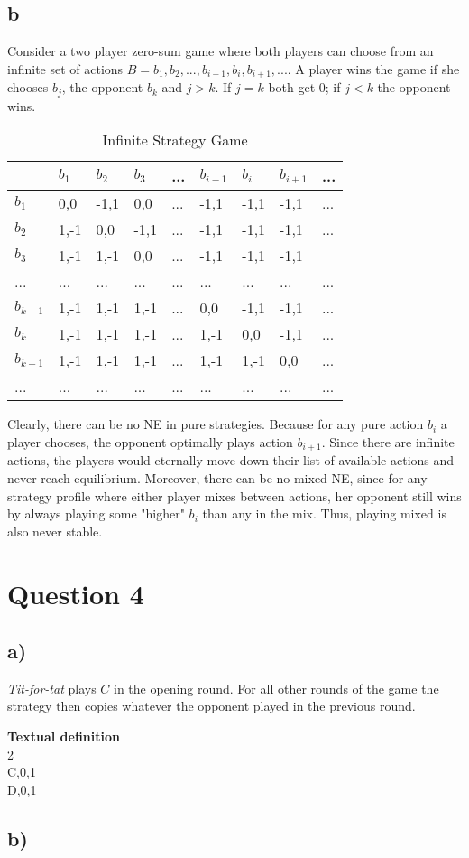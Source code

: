 \documentclass[10pt,a4paper]{article}
\begin{document}
\subsection*{b}
Consider a two player zero-sum game where both players can choose from an infinite set of actions $B={b_1,b_2,...,b_{i-1},b_i,b_{i+1},...}$. A player wins the game if she chooses $b_j$, the opponent $b_k$ and $j>k$. If $j=k$ both get $0$; if $j<k$ the opponent wins. 

\begin{table}[h]
\centering
\caption{Infinite Strategy Game}
\begin{tabular}{|l|l|l|l|l|l|l|l|l|}
\hline
          & $b_1$ & $b_2$ & $b_3$ & ... & $b_{i-1}$ & $b_{i}$ & $b_{i+1}$ & ... \\ \hline
$b_1$     & 0,0   & -1,1  & 0,0   & ... & -1,1       & -1,1     & -1,1       & ... \\ \hline
$b_2$     & 1,-1  & 0,0   & -1,1  & ... & -1,1       & -1,1     & -1,1      & ... \\ \hline
$b_3$     & 1,-1   & 1,-1  & 0,0   & ... & -1,1       & -1,1     & -1,1       &     \\ \hline
...       & ...   & ...   & ...   & ... & ...       & ...     & ...       & ... \\ \hline
$b_{k-1}$ & 1,-1   & 1,-1   & 1,-1   & ... & 0,0       & -1,1    & -1,1       & ... \\ \hline
$b_{k}$   & 1,-1   & 1,-1   & 1,-1   & ... & 1,-1      & 0,0     & -1,1      & ... \\ \hline
$b_{k+1}$ & 1,-1   & 1,-1   & 1,-1   & ... & 1,-1       & 1,-1    & 0,0       & ... \\ \hline
...       & ...   & ...   & ...   & ... & ...       & ...     & ...       & ... \\ \hline
\end{tabular}
\end{table}

Clearly, there can be no NE in pure strategies. Because for any pure action $b_i$ a player chooses, the opponent optimally plays action $b_{i+1}$. Since there are infinite actions, the players would eternally move down their list of available actions and never reach equilibrium. Moreover, there can be no mixed NE, since for any strategy profile where either player mixes between actions, her opponent still wins by always playing some "higher" $b_i$ than any in the mix. Thus, playing mixed is also never stable.

\section*{Question 4}
\subsection*{a)}
\textit{Tit-for-tat} plays $C$ in the opening round. For all other rounds of the game the strategy then copies whatever the opponent played in the previous round.

\textbf{Textual definition}\\
2\\
C,0,1\\
D,0,1

\subsection*{b)}
\end{document}
